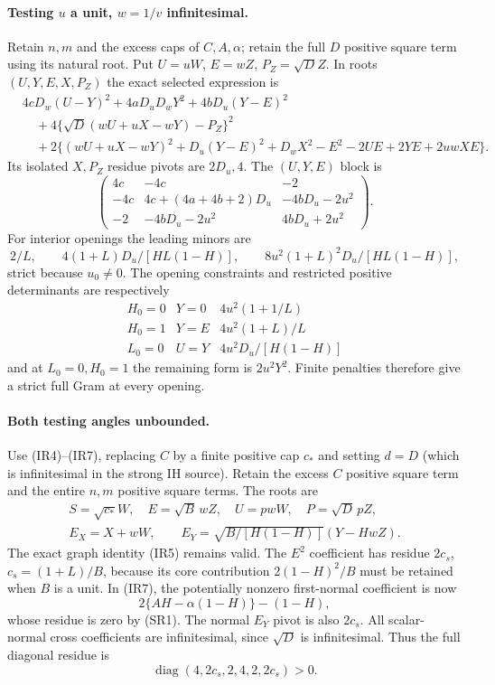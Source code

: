\paragraph{Testing $u$ a unit, $w=1/v$ infinitesimal.}
Retain $n,m$ and the excess caps of $C,A,\alpha$; retain the full
$D$ positive square term using its natural root. Put
$U=uW$, $E=wZ$, $P_Z=\sqrt D Z$. In roots $(U,Y,E,X,P_Z)$ the exact
selected expression is
\begin{align*}
 &4cD_w(U-Y)^2+4aD_uD_wY^2+4bD_u(Y-E)^2\\
 &\quad+4\{\sqrt D(wU+uX-wY)-P_Z\}^2\\
 &\quad+2\{(wU+uX-wY)^2+D_u(Y-E)^2+D_wX^2-E^2
                   -2UE+2YE+2uwXE\}.
\tag{SR4}
\end{align*}
Its isolated $X,P_Z$ residue pivots are $2D_u,4$. The $(U,Y,E)$ block is
\[
 \begin{pmatrix}
 4c&-4c&-2\\
 -4c&4c+(4a+4b+2)D_u&-4bD_u-2u^2\\
 -2&-4bD_u-2u^2&4bD_u+2u^2
 \end{pmatrix}.
\tag{SR5}
\]
For interior openings the leading minors are
\[
 2/L,\qquad4(1+L)D_u/[HL(1-H)],\qquad
 8u^2(1+L)^2D_u/[HL(1-H)],
\tag{SR6}
\]
strict because $u_0\ne0$. The opening constraints and restricted
positive determinants are respectively
\[
 \begin{array}{c|c|c}
 H_0=0&Y=0&4u^2(1+1/L)\\
 H_0=1&Y=E&4u^2(1+L)/L\\
 L_0=0&U=Y&4u^2D_u/[H(1-H)]
 \end{array}
\]
and at $L_0=0,H_0=1$ the remaining form is $2u^2Y^2$.
Finite penalties therefore give a strict full Gram at every opening.

\paragraph{Both testing angles unbounded.}
Use (IR4)--(IR7), replacing $C$ by a finite positive cap $c_*$ and
setting $d=D$ (which is infinitesimal in the strong IH source).
Retain the excess $C$ positive square term and the entire $n,m$ positive square terms.
The roots are
\[
 \begin{gathered}
 S=\sqrt{c_*}W,\quad E=\sqrt B\,wZ,\quad U=pwW,\quad P=\sqrt D\,pZ,\\
 E_X=X+wW,\qquad E_Y=\sqrt{B/[H(1-H)]}(Y-HwZ).
 \end{gathered}
\]
The exact graph identity (IR5) remains valid. The $E^2$ coefficient
has residue $2c_s$, $c_s=(1+L)/B$, because its core contribution
$2(1-H)^2/B$ must be retained when $B$ is a unit.
In (IR7), the potentially nonzero first-normal coefficient is now
\[
 2\{AH-\alpha(1-H)\}-(1-H),
\]
whose residue is zero by (SR1). The normal $E_Y$ pivot is also $2c_s$.
All scalar-normal cross coefficients are infinitesimal, since
$\sqrt D$ is infinitesimal. Thus the full diagonal residue is
\[
 \operatorname{diag}(4,2c_s,2,4,2,2c_s)>0.
\tag{SR7}
\]

